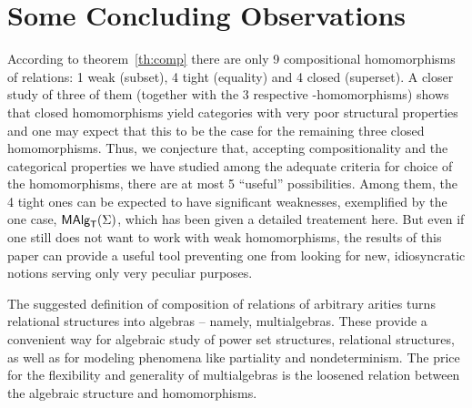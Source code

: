 \documentclass[10pt]{article}
\begin{document}

\section{Some Concluding Observations}


According to theorem~\ref{th:comp} there are only 9 compositional
homomorphisms of relations: 1 weak (subset), 4 tight (equality) and 4
closed (superset).  A closer study of three of them (together with the
3 respective \PS-homomorphisms) shows that closed homomorphisms yield
categories with very poor structural properties and one
may expect that this to be the case for the remaining three closed
homomorphisms. Thus, we conjecture that, accepting compositionality and 
the categorical properties
we have studied among the adequate criteria for choice of the homomorphisms, 
 there are at most 5 ``useful''
possibilities. Among them, the 4 tight ones can be expected to have
significant weaknesses, exemplified by the one case, $\mbox{\rm\sf MAlg}_{\sf T}(\Sigma)$, which has been
given a detailed treatement here.  But even if one still does not want to
work with weak homomorphisms, the results of this paper
can provide a useful tool
preventing one from looking for new, idiosyncratic notions serving
only very peculiar purposes.

The suggested definition of composition of relations of arbitrary
arities turns relational structures into algebras -- namely,
multialgebras.  These provide a convenient way for algebraic study of
power set structures, relational structures, as well as for modeling
phenomena like partiality and nondeterminism. The price for the
flexibility and generality of multialgebras is the loosened relation
between the algebraic structure and homomorphisms.
\end{document}
